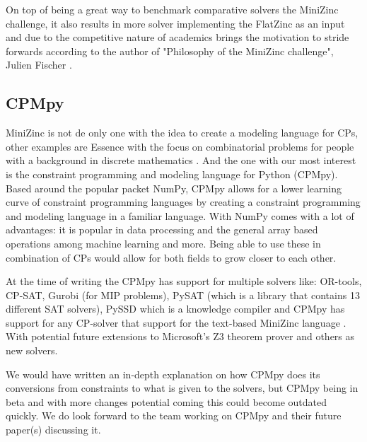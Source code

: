 On top of being a great way to benchmark comparative solvers the MiniZinc challenge, it also results in more solver implementing the FlatZinc as an input and due to the competitive nature of academics brings the motivation to stride forwards according to the author of "Philosophy of the MiniZinc challenge", Julien Fischer \cite{59stuckey2010philosophy}.

\subsection{CPMpy}
\label{CP:CPMpy}
MiniZinc is not de only one with the idea to create a modeling language for CPs, other examples are Essence with the focus on combinatorial problems for people with a background in discrete mathematics \cite{70frisch2008essence}.
And the one with our most interest is the constraint programming and modeling language for Python (CPMpy). Based around the popular packet NumPy, CPMpy allows for a lower learning curve of constraint programming languages by creating a constraint programming and modeling language in a familiar language\cite{17guns2019increasing}. 
With NumPy comes with a lot of advantages: it is popular in data processing and the general array based operations among machine learning and more. 
Being able to use these in combination of CPs would allow for both fields to grow closer to each other. 

At the time of writing the CPMpy has support for multiple solvers like: OR-tools, CP-SAT, Gurobi (for MIP problems), PySAT (which is a library that contains 13 different SAT solvers), PySSD which is a knowledge compiler  and CPMpy has support for any CP-solver that support for the text-based MiniZinc language \cite{CPMpyDoc, CPMpyGithub}. With potential future extensions to Microsoft's Z3 theorem prover and others as new solvers.

We would have written an in-depth explanation on how CPMpy does its conversions from constraints to what is given to the solvers, but CPMpy being in beta and with more changes potential coming this could become outdated quickly. We do look forward to the team working on CPMpy and their future paper(s) discussing it.


